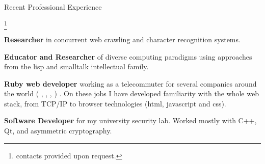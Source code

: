 \begin{rubric}{Recent Professional Experience}{
  \footnote{contacts provided upon request.}
  
  \entry*[2010 - Present]
  \textbf{Researcher} in concurrent web crawling and character
  recognition systems.

  \entry*[2009]
  \textbf{Educator and Researcher} of diverse computing paradigms
  using approaches from the lisp and smalltalk intellectual family.

  \entry*[2007-2009] \textbf{Ruby web developer} working as a
  telecommuter for several companies around the world (
  ,
  ,
  ,
   ) . On
  these jobs I have developed familiarity with the whole web stack,
  from TCP/IP to browser technologies (html, javascript and css).

  \entry*[2005 - 2007] 
  \textbf{Software Developer} for my university security lab. Worked
  mostly with C++, Qt, and asymmetric cryptography.  

}\end{rubric}

